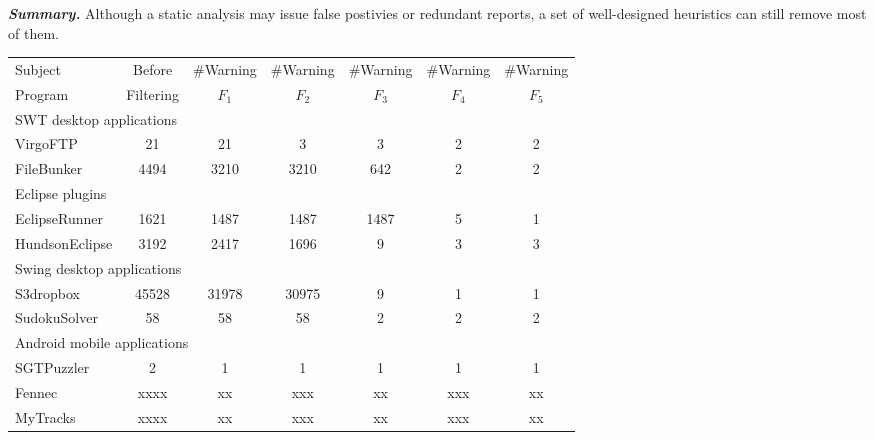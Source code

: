 \vspace{1mm}

\noindent \textbf{\textit{Summary.}} Although a static analysis may
issue false postivies or redundant reports, a set of well-designed
heuristics can still remove most of them.

\begin{table}[t]
\begin{center}
 \fontsize{9pt}{\baselineskip}\selectfont
\setlength{\tabcolsep}{.01\tabcolsep}
\hspace*{-0.2cm}
\begin{tabular}{|l||c|c|c|c|c|c|}
\hline
 Subject & Before & \#Warning & \#Warning & \#Warning & \#Warning& \#Warning \\
 Program & Filtering & $F_1$ & $F_2$ & $F_3$&$F_4$ & $F_5$\\
\hline \hline
\multicolumn{7}{|l|}{SWT desktop applications}   \\
 \hline
 VirgoFTP &  21 &  21 &  3 & 3 &  2 & 2\\
 \hline
 FileBunker &  4494 &  3210 &  3210 &  642 &  2 & 2\\
 \hline
 \hline
\multicolumn{7}{|l|}{Eclipse plugins}   \\
 \hline
 EclipseRunner&  1621 &  1487 &  1487 & 1487 &  5 & 1\\
 \hline
 HundsonEclipse&  3192 &  2417 &  1696 & 9 &  3 & 3\\
 \hline
 \hline
\multicolumn{7}{|l|}{Swing desktop applications}   \\
 \hline
 S3dropbox&  45528 &  31978 &  30975 & 9 &  1 & 1\\
 \hline
 SudokuSolver &  58 &  58 &  58 & 2 &  2 & 2\\
 \hline
 \hline
\multicolumn{7}{|l|}{Android mobile applications}   \\
 \hline
 SGTPuzzler&  2 &  1 &  1 & 1 &  1 & 1\\
 \hline
 Fennec &  xxxx &  xx &  xxx & xx &  xxx & xx\\
 \hline
 MyTracks &  xxxx &  xx &  xxx & xx &  xxx & xx\\
\hline
\end{tabular}
\end{center}
\vspace{-15pt}
\end{table}


